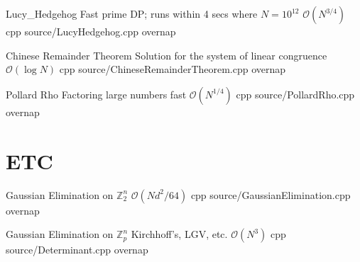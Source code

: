 \documentclass[landscape, 10pt, a4paper, oneside, twocolumn]{extarticle}
\begin{document}
\Algorithm
{Lucy\_Hedgehog}
{Fast prime DP; runs within 4 secs where $N=10^{12}$}
{$\mathcal{O}(N^{3/4})$}
{cpp}
{source/LucyHedgehog.cpp}
{overnap}

\Algorithm
{Chinese Remainder Theorem}
{Solution for the system of linear congruence}
{$\mathcal{O}(\log{N})$}
{cpp}
{source/ChineseRemainderTheorem.cpp}
{overnap}

\Algorithm
{Pollard Rho}
{Factoring large numbers fast}
{$\mathcal{O}(N^{1/4})$}
{cpp}
{source/PollardRho.cpp}
{overnap}


\section{ETC}

\Algorithm
{Gaussian Elimination on $\mathbb{Z}^n_2$}
{}
{$\mathcal{O}(Nd^2/64)$}
{cpp}
{source/GaussianElimination.cpp}
{overnap}

\Algorithm
{Gaussian Elimination on $\mathbb{Z}^n_p$}
{Kirchhoff's, LGV, etc.}
{$\mathcal{O}(N^3)$}
{cpp}
{source/Determinant.cpp}
{overnap}





\end{document}
